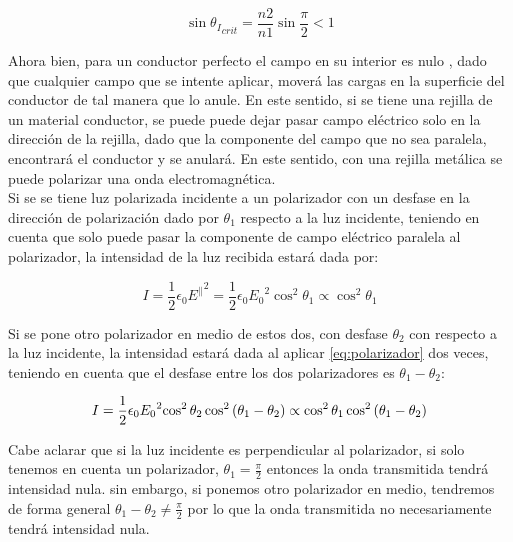 \documentclass[prb,aps,twocolumn,preprintnumbers,amsmath,amssymb]{revtex4}
\begin{document}
\begin{equation}
\sin{{\theta_I}_{crit}} = \frac{n2}{n1}\sin{\frac{\pi}{2}} < 1
\label{eq:rit}
\end{equation}

Ahora bien, para un conductor perfecto el campo en su interior es nulo \cite{Griffiths}, dado que cualquier campo que se intente aplicar, moverá las cargas en la superficie del conductor de tal manera que lo anule. En este sentido, si se tiene una rejilla de un material conductor, se puede puede dejar pasar campo eléctrico solo en la dirección de la rejilla, dado que la componente del campo que no sea paralela, encontrará el conductor y se anulará. En este sentido, con una rejilla metálica se puede polarizar una onda electromagnética.\\

Si se se tiene luz polarizada incidente a un polarizador con un desfase en la dirección de polarización dado por $\theta_1$ respecto a la luz incidente, teniendo en cuenta que solo puede pasar la componente de campo eléctrico paralela al polarizador, la intensidad de la luz recibida estará dada por:

\begin{equation}
I = \frac{1}{2}\epsilon_0{E^{\parallel}}^2 = \frac{1}{2}\epsilon_0{E_0}^2{\cos^2{\theta_1}} \propto \cos^2{\theta_1}
\label{eq:polarizador}
\end{equation}

Si se pone otro polarizador en medio de estos dos, con desfase $\theta_2$ con respecto a la luz incidente, la intensidad estará dada al aplicar \ref{eq:polarizador} dos veces, teniendo en cuenta que el desfase entre los dos polarizadores es $\theta_1-\theta_2$:

\begin{equation}
\small
I = \frac{1}{2}\epsilon_0{E_0}^2{\cos^2{\theta_2}}\cos^2{ \left( \theta_1-\theta_2 \right) } \propto \cos^2{ \theta_1}\cos^2{ \left( \theta_1-\theta_2 \right) }
\label{eq:polarizador2}
\end{equation}

Cabe aclarar que si la luz incidente es perpendicular al polarizador, si solo tenemos en cuenta un polarizador, $\theta_1 = \frac{\pi}{2}$ entonces la onda transmitida tendrá intensidad nula. sin embargo, si ponemos otro polarizador en medio, tendremos de forma general $\theta_1 - \theta_2 \neq \frac{\pi}{2}$ por lo que la onda transmitida no necesariamente tendrá intensidad nula.\\
\end{document}
